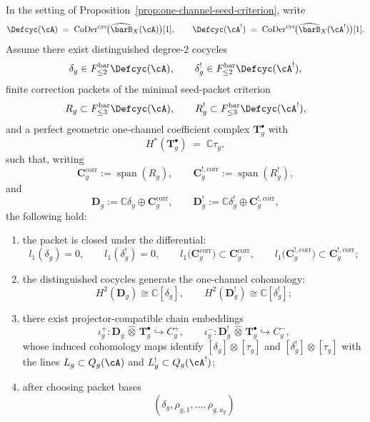 \begin{proposition}\label{prop:one-channel-minimal-seed-packet-criterion}
In the setting of
Proposition~\textup{\ref{prop:one-channel-seed-criterion}}, write
\[
\Defcyc(\cA)
\;=\;
\operatorname{CoDer}^{\mathrm{cyc}}
\!\bigl(\widehat{\barB}_X(\cA)\bigr)[1],
\qquad
\Defcyc(\cA^!)
\;=\;
\operatorname{CoDer}^{\mathrm{cyc}}
\!\bigl(\widehat{\barB}_X(\cA^!)\bigr)[1].
\]
Assume there exist distinguished degree-$2$ cocycles
\[
\delta_g \in F_{\leq 2}^{\mathrm{bar}}\Defcyc(\cA),
\qquad
\delta_g^! \in F_{\leq 2}^{\mathrm{bar}}\Defcyc(\cA^!),
\]
finite correction packets of the minimal seed-packet criterion
\[
R_g \subset F_{\leq 3}^{\mathrm{bar}}\Defcyc(\cA),
\qquad
R_g^! \subset F_{\leq 3}^{\mathrm{bar}}\Defcyc(\cA^!),
\]
and a perfect geometric one-channel coefficient complex
$\mathbf{T}_g^\bullet$ with
\[
H^*(\mathbf{T}_g^\bullet) \;=\; \mathbb{C}\tau_g,
\]
such that, writing
\[
\mathbf{C}_g^{\mathrm{corr}} := \operatorname{span}(R_g),
\qquad
\mathbf{C}_g^{!,\mathrm{corr}} := \operatorname{span}(R_g^!),
\]
and
\[
\mathbf{D}_g := \mathbb{C}\delta_g \oplus \mathbf{C}_g^{\mathrm{corr}},
\qquad
\mathbf{D}_g^! := \mathbb{C}\delta_g^! \oplus \mathbf{C}_g^{!,\mathrm{corr}},
\]
the following hold:
\begin{enumerate}[label=\textup{(\roman*)}]
\item the packet is closed under the differential:
  \[
  l_1(\delta_g)=0,
  \qquad
  l_1(\delta_g^!)=0,
  \qquad
  l_1\bigl(\mathbf{C}_g^{\mathrm{corr}}\bigr)
  \subset \mathbf{C}_g^{\mathrm{corr}},
  \qquad
  l_1\bigl(\mathbf{C}_g^{!,\mathrm{corr}}\bigr)
  \subset \mathbf{C}_g^{!,\mathrm{corr}};
  \]
\item the distinguished cocycles generate the one-channel cohomology:
  \[
  H^2(\mathbf{D}_g)\cong \mathbb{C}[\delta_g],
  \qquad
  H^2(\mathbf{D}_g^!)\cong \mathbb{C}[\delta_g^!];
  \]
\item there exist projector-compatible chain embeddings
  \[
  \iota_g^+ \colon
  \mathbf{D}_g \,\widehat{\otimes}\, \mathbf{T}_g^\bullet
  \hookrightarrow C_g^+,
  \qquad
  \iota_g^- \colon
  \mathbf{D}_g^! \,\widehat{\otimes}\, \mathbf{T}_g^\bullet
  \hookrightarrow C_g^-,
  \]
  whose induced cohomology maps identify
  $[\delta_g]\otimes[\tau_g]$ and
  $[\delta_g^!]\otimes[\tau_g]$ with the lines
  $L_g \subset Q_g(\cA)$ and
  $L_g^! \subset Q_g(\cA^!)$;
\item after choosing packet bases
  \[
  (\delta_g,\rho_{g,1},\ldots,\rho_{g,u_g})
\]
\end{enumerate}
\end{proposition}

